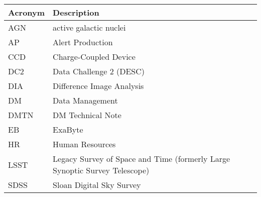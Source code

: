 \addtocounter{table}{-1}
\begin{longtable}{p{}p{}}\hline
\textbf{Acronym} & \textbf{Description}  \\\hline

AGN & active galactic nuclei \\\hline
AP & Alert Production \\\hline
CCD & Charge-Coupled Device \\\hline
DC2 & Data Challenge 2 (DESC) \\\hline
DIA & Difference Image Analysis \\\hline
DM & Data Management \\\hline
DMTN & DM Technical Note \\\hline
EB & ExaByte \\\hline
HR & Human Resources \\\hline
LSST & Legacy Survey of Space and Time (formerly Large Synoptic Survey Telescope) \\\hline
SDSS & Sloan Digital Sky Survey \\\hline
\end{longtable}
